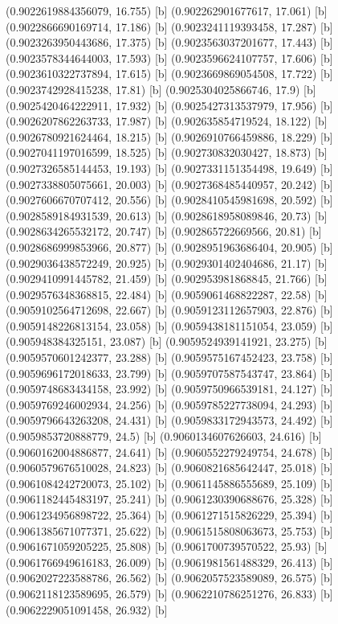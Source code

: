 {{{(0.9022619884356079, 16.755) [b] 
(0.902262901677617, 17.061) [b] 
(0.9022866690169714, 17.186) [b] 
(0.9023241119393458, 17.287) [b] 
(0.9023263950443686, 17.375) [b] 
(0.9023563037201677, 17.443) [b] 
(0.9023578344644003, 17.593) [b] 
(0.9023596624107757, 17.606) [b] 
(0.9023610322737894, 17.615) [b] 
(0.9023669869054508, 17.722) [b] 
(0.9023742928415238, 17.81) [b] 
(0.9025304025866746, 17.9) [b] 
(0.9025420464222911, 17.932) [b] 
(0.9025427313537979, 17.956) [b] 
(0.9026207862263733, 17.987) [b] 
(0.902635854719524, 18.122) [b] 
(0.9026780921624464, 18.215) [b] 
(0.9026910766459886, 18.229) [b] 
(0.9027041197016599, 18.525) [b] 
(0.902730832030427, 18.873) [b] 
(0.9027326585144453, 19.193) [b] 
(0.9027331151354498, 19.649) [b] 
(0.9027338805075661, 20.003) [b] 
(0.9027368485440957, 20.242) [b] 
(0.9027606670707412, 20.556) [b] 
(0.9028410545981698, 20.592) [b] 
(0.9028589184931539, 20.613) [b] 
(0.9028618958089846, 20.73) [b] 
(0.9028634265532172, 20.747) [b] 
(0.902865722669566, 20.81) [b] 
(0.9028686999853966, 20.877) [b] 
(0.9028951963686404, 20.905) [b] 
(0.9029036438572249, 20.925) [b] 
(0.9029301402404686, 21.17) [b] 
(0.9029410991445782, 21.459) [b] 
(0.902953981868845, 21.766) [b] 
(0.9029576348368815, 22.484) [b] 
(0.9059061468822287, 22.58) [b] 
(0.9059102564712698, 22.667) [b] 
(0.9059123112657903, 22.876) [b] 
(0.9059148226813154, 23.058) [b] 
(0.9059438181151054, 23.059) [b] 
(0.905948384325151, 23.087) [b] 
(0.9059524939141921, 23.275) [b] 
(0.9059570601242377, 23.288) [b] 
(0.9059575167452423, 23.758) [b] 
(0.9059696172018633, 23.799) [b] 
(0.9059707587543747, 23.864) [b] 
(0.9059748683434158, 23.992) [b] 
(0.9059750966539181, 24.127) [b] 
(0.9059769246002934, 24.256) [b] 
(0.9059785227738094, 24.293) [b] 
(0.9059796643263208, 24.431) [b] 
(0.9059833172943573, 24.492) [b] 
(0.9059853720888779, 24.5) [b] 
(0.9060134607626603, 24.616) [b] 
(0.9060162004886877, 24.641) [b] 
(0.9060552279249754, 24.678) [b] 
(0.9060579676510028, 24.823) [b] 
(0.9060821685642447, 25.018) [b] 
(0.9061084242720073, 25.102) [b] 
(0.9061145886555689, 25.109) [b] 
(0.9061182445483197, 25.241) [b] 
(0.9061230390688676, 25.328) [b] 
(0.9061234956898722, 25.364) [b] 
(0.9061271515826229, 25.394) [b] 
(0.9061385671077371, 25.622) [b] 
(0.9061515808063673, 25.753) [b] 
(0.9061671059205225, 25.808) [b] 
(0.9061700739570522, 25.93) [b] 
(0.9061766949616183, 26.009) [b] 
(0.9061981561488329, 26.413) [b] 
(0.9062027223588786, 26.562) [b] 
(0.9062057523589089, 26.575) [b] 
(0.9062118123589695, 26.579) [b] 
(0.9062210786251276, 26.833) [b] 
(0.9062229051091458, 26.932) [b] 
}}}
